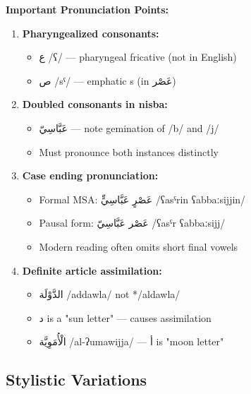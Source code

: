 \documentclass[letterpaper,12pt]{article}
\begin{document}
\begin{tcolorbox}[colback=white,colframe=accentcolor,breakable]
\textbf{Important Pronunciation Points:}

\begin{enumerate}
\item \textbf{Pharyngealized consonants:}
\begin{itemize}
\item \textarabic{ع} /ʕ/ — pharyngeal fricative (not in English)
\item \textarabic{ص} /sˤ/ — emphatic s (in \textarabic{عَصْر})
\end{itemize}

\item \textbf{Doubled consonants in nisba:}
\begin{itemize}
\item \textarabic{عَبَّاسِيّ} — note gemination of /b/ and /j/
\item Must pronounce both instances distinctly
\end{itemize}

\item \textbf{Case ending pronunciation:}
\begin{itemize}
\item Formal MSA: \textarabic{عَصْرٍ عَبَّاسِيٍّ} /ʕasˤrin ʕabbaːsijjin/
\item Pausal form: \textarabic{عَصْر عَبَّاسِيّ} /ʕasˤr ʕabbaːsijj/
\item Modern reading often omits short final vowels
\end{itemize}

\item \textbf{Definite article assimilation:}
\begin{itemize}
\item \textarabic{الدَّوْلَة} /addawla/ not */aldawla/
\item \textarabic{د} is a "sun letter" — causes assimilation
\item \textarabic{الْأُمَوِيَّة} /al-ʔumawijja/ — \textarabic{أ} is "moon letter"
\end{itemize}
\end{enumerate}
\end{tcolorbox}

\subsection{Stylistic Variations}
\end{document}
